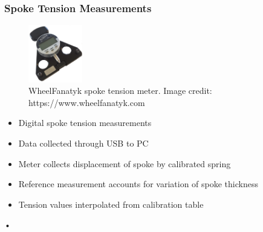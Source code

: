 \documentclass[mathserif]{beamer}
\begin{document}
\begin{frame}
      \frametitle{Spoke Tension Measurements}
      \begin{figure}
      	\includegraphics[height = 2.5cm]{wheelfanatyk}\\
        {\tiny WheelFanatyk spoke tension meter.  Image credit: https://www.wheelfanatyk.com}
      \end{figure}

      \begin{itemize}
          \item Digital spoke tension measurements
          \item Data collected through USB to PC
          \item Meter collects displacement of spoke by calibrated spring
          \item Reference measurement accounts for variation of spoke thickness 
          \item Tension values interpolated from calibration table
      \end{itemize}•
\end{frame}
\end{document}
